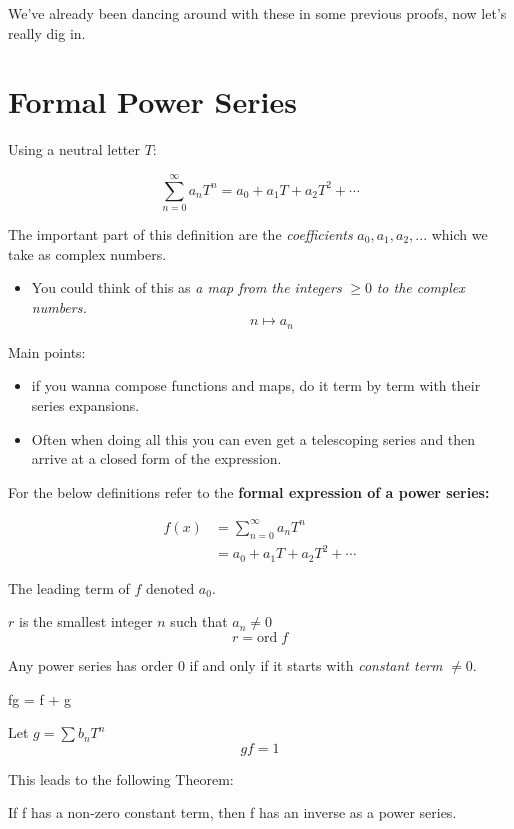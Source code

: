 We've already been dancing around with these in some previous proofs, now let's really dig in. 
\section{Formal Power Series}
\begin{defn}
  Using a neutral letter $T$:

  \[\sum_{n = 0}^{\infty}a_n T^n = a_0 + a_1 T + a_2 T^2 + \cdots \]

\end{defn}
The important part of this definition are the \textit{coefficients} $a_0, a_1, a_2, ...$ which we 
take as complex numbers.
\begin{itemize}
  \item You could think of this as \textit{a map from the integers} $ \geq 0 $ \textit{to the complex numbers.}
  \[n \mapsto a_n \]
\end{itemize}

Main points: 
  \begin{itemize}
    \item if you wanna compose functions and maps, do it term by term with their series expansions.
    \item Often when doing all this you can even get a telescoping series and then arrive at a closed form of the expression. 
  \end{itemize}

For the below definitions refer to the \textbf{formal expression of a power series:}

\begin{align*}
  f(x) &= \sum_{n = 0}^{\infty} a_n T^n \\
  &= a_0 + a_1 T + a_2 T^2 + \cdots
\end{align*}

\begin{defn}
  The leading term of $f$ denoted $a_0$.
\end{defn}

\begin{defn}
  $r$ is the smallest integer $n$ such that $a_n \not = 0$
  \[r = \text{ord}\; f\]
\end{defn}

\begin{thm}
  Any power series has order $0$ if and only if it starts with \textit{constant term} $\not = 0.$
\end{thm}

\begin{thm}
  \; fg = \; f + \; g
\end{thm}

\begin{defn}
  Let $g = \sum b_n T^n$
  \[gf = 1\]
\end{defn}
This leads to the following Theorem:
\begin{thm}
  If f has a non-zero constant term, then f has an inverse as a power series.
\end{thm}
\newpage